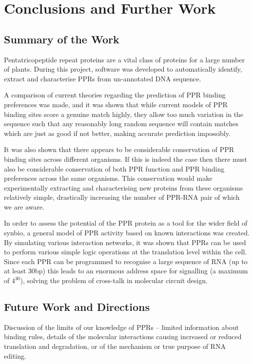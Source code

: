 
\chapter{Conclusions and Further Work}
\label{chap:Conclusions} 

\section{Summary of the Work}

Pentatricopeptide repeat proteins are a vital class of proteins for a large
number of plants.
During this project, software was developed to automatically identify, extract 
and characterise PPRs from un-annotated DNA sequence.

A comparison of current theories regarding the prediction of PPR binding
preferences was made, and it was shown that while current models of PPR binding
sites score a genuine match highly, they allow too much variation in the
sequence such that any reasonably long random sequence will contain matches 
which are just as good if not better, making accurate prediction impossibly.

It was also shown that there appears to be considerable conservation of PPR 
binding sites across different organisms.
If this is indeed the case then there must also be considerable conservation of
both PPR function and PPR binding preferences across the same organisms.
This conservation would make experimentally extracting and characterising new
proteins from these organisms relatively simple, drastically increasing the
number of PPR-RNA pair of which we are aware.

In order to assess the potential of the PPR protein as a tool for the wider
field of synbio, a general model of PPR activity based on known interactions
was created.
By simulating various interaction networks, it was shown that PPRs can be 
used to perform various simple logic operations at the translation level within
the cell.
Since each PPR can be programmed to recognise a large sequence of RNA (up to at
least $30$bp) this leads to an enormous address space for signalling (a maximum
of $4^{30}$), solving the problem of cross-talk in molecular circuit design.

\section{Future Work and Directions}

Discussion of the limits of our knowledge of PPRs -- limited information about
binding rules, details of the molecular interactions causing increased or
reduced translation and degradation, or of the mechanism or true purpose of RNA
editing.


